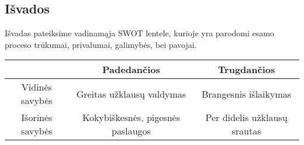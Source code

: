 		\subsection{Išvados}
			Išvadas pateiksime vadinamąja SWOT lentele, kurioje yra parodomi esamo proceso trūkumai, privalumai, galimybės, bei pavojai.	
			\begin{center}
  				\begin{tabular}{ | c | c | c | }
				\hline
    						& Padedančios & Trugdančios   \\ \hline
    				Vidinės savybės & Greitas užklausų valdymas & Brangesnis išlaikymas \\ \hline
    				Išorinės savybės & Kokybiškesnės, pigesnės paslaugos & Per didelis užklausų srautas \\
				\hline
  				\end{tabular}
			\end{center}	
